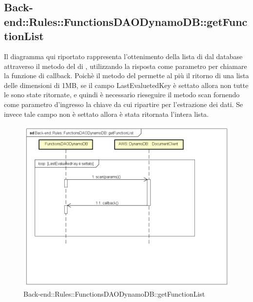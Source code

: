 \subsection{Back-end::Rules::FunctionsDAODynamoDB::getFunctionList}
Il diagramma qui riportato rappresenta l'ottenimento della lista di  dal database attraverso il metodo  del  di , utilizzando la risposta come parametro per chiamare la funzione di callback. Poichè il metodo  del  permette al più il ritorno di una lista delle dimensioni di 1MB, se il campo LastEvaluetedKey è settato allora non tutte le  sono state ritornate, e quindi è necessario rieseguire il metodo scan fornendo come parametro d'ingresso la chiave da cui ripartire per l'estrazione dei dati. Se invece tale campo non è settato allora è stata ritornata l'intera lista.
 \begin{figure}[h] \centering \includegraphics[width=\textwidth,height=\textheight,keepaspectratio]{images/diagrams/back-end/Ufficial_Backend/Back-endRulesFunctionsDAODynamoDBgetFunctionList.png} 	\caption{Back-end::Rules::FunctionsDAODynamoDB::getFunctionList}
\end{figure} 
\newpage

